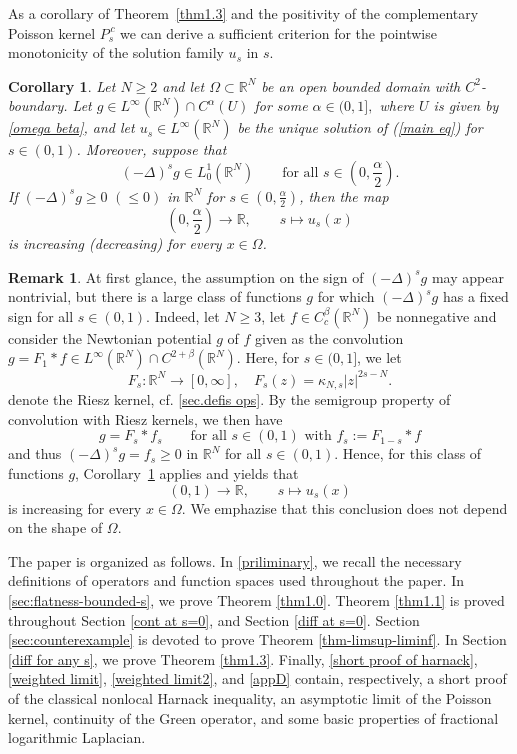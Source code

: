 \documentclass[notitlepage,11pt,reqno]{amsart}
\newtheorem{corollary}[theorem]{Corollary}
\theoremstyle{definition}
\newtheorem{remark}[theorem]{Remark}
\numberwithin{equation}{section}
\newcommand{\RRN}{\mathds{R}^{N}}
\newcommand{\R}{\mathds{R}}
\newcommand{\RR}{\mathds{R}}
\begin{document}
As a corollary of Theorem~\ref{thm1.3} and the positivity of the complementary Poisson kernel $  P_s^{\,c}$ we can derive a sufficient criterion for the pointwise monotonicity of the solution family $u_s$ in $s$.

\begin{corollary}
  \label{cor-thm-1-3}
  Let $N\geq 2$ and let $\Omega \subset \RRN$ be an open bounded domain with $C^2$-boundary. Let $g \in L^{\infty}(\RR^N) \cap C^{\alpha}(U)$ for some $\alpha\in(0,1],$ where $U$ is given by \eqref{omega beta}, and let $u_s \in L^\infty(\R^N)$ be the unique solution of (\ref{main eq}) for $s \in (0,1)$. Moreover, suppose that
  $$
  (-\Delta)^s g \in L^1_0(\R^N) \qquad \text{for all $s \in (0,\frac{\alpha}{2})$.}    
$$
  If $(-\Delta)^sg \geq 0\,\, (\leq 0)$ in $\R^N$ for $s \in (0,\frac{\alpha}{2})$, then the map
$$
(0,\frac{\alpha}{2}) \to \R, \qquad s \mapsto u_s(x)
$$
is increasing (decreasing) for every $x \in \Omega$. 
\end{corollary}

\begin{remark}
\label{example-monotonicity}
At first glance, the assumption on the sign of $(-\Delta)^s g$ may appear nontrivial, but there is a large class of functions $g$ for which $(-\Delta)^s g$ has a fixed sign for all $s \in (0,1)$. Indeed, let $N \ge 3$, let $f \in C_c^\beta(\R^N)$ be nonnegative and consider the Newtonian potential $g$ of $f$ given as the convolution $g=F_1\ast f \in L^\infty(\R^N) \cap C^{2+\beta}(\R^N)$. Here, for $s \in (0,1]$, we let 
$$
F_s:\RR^N\to[0,\infty], \quad F_s(z)=\kappa_{N,s}|z|^{2s-N}.
$$
denote the Riesz kernel, cf. \cref{sec.defis ops}. By the semigroup property of convolution with Riesz kernels, we then have
$$
g = F_s \ast f_s  \qquad \text{for all $s \in (0,1)$ with $f_s := F_{1-s} \ast f$}
$$
and thus $(-\Delta)^s g = f_s \ge 0$ in $\R^N$ for all $s \in (0,1)$. Hence, for this class of functions $g$, Corollary~\ref{cor-thm-1-3} applies and yields that
$$
(0,1) \to \R, \qquad s \mapsto u_s(x)
$$
is increasing for every $x \in \Omega$. We emphazise that this conclusion does not depend on the shape of $\Omega$.
\end{remark}

The paper is organized as follows. In \cref{priliminary}, we recall the necessary definitions of operators and function spaces used throughout the paper. In \cref{sec:flatness-bounded-s}, we prove Theorem \ref{thm1.0}. Theorem \ref{thm1.1} is proved throughout Section \ref{cont at s=0}, and Section \ref{diff at s=0}. Section \ref{sec:counterexample} is devoted to prove Theorem \ref{thm-limsup-liminf}. In Section \ref{diff for any s}, we prove Theorem \ref{thm1.3}. Finally, \cref{short proof of harnack}, \cref{weighted limit}, \cref{weighted limit2}, and \cref{appD} contain, respectively, a short proof of the classical nonlocal Harnack inequality, an asymptotic limit of the Poisson kernel, continuity of the Green operator, and some basic properties of fractional logarithmic Laplacian. 
\end{document}
